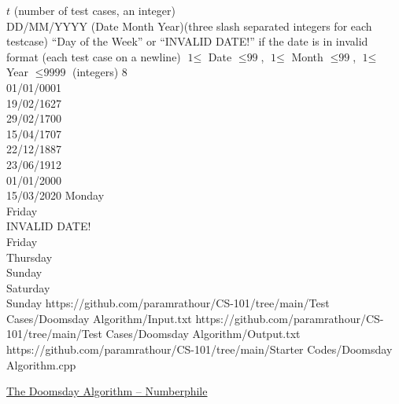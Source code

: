 \documentclass[../../Problems]{subfiles}
\begin{document}
\begin{testcasesMore}
	{$t$ \hfill(number of test cases, an integer)\\
	DD/MM/YYYY (Date Month Year)\hfill(three slash separated integers for each testcase)}
	{``Day of the Week'' or  ``INVALID DATE!'' if the date is in invalid format
 \hfill{(each test case on a newline)}}
	{$\text{1} \leq$ Date $\leq \text{99}$, $\text{1} \leq$ Month $\leq \text{99}$, $\text{1} \leq$ Year $\leq \text{9999}$ \hfill(integers)}
	{8\\01/01/0001\\19/02/1627\\29/02/1700\\15/04/1707\\22/12/1887\\23/06/1912\\01/01/2000\\15/03/2020}
	{Monday\\Friday\\INVALID DATE!\\Friday\\Thursday\\Sunday\\Saturday\\Sunday}
	{https://github.com/paramrathour/CS-101/tree/main/Test Cases/Doomsday Algorithm/Input.txt}
	{https://github.com/paramrathour/CS-101/tree/main/Test Cases/Doomsday Algorithm/Output.txt}
	{https://github.com/paramrathour/CS-101/tree/main/Starter Codes/Doomsday Algorithm.cpp}
\end{testcasesMore}
\begin{funvideo}{\label{sec:fvdoomsday}}
\href{https://youtu.be/z2x3SSBVGJU}{The Doomsday Algorithm -- Numberphile}
\end{funvideo}
\end{document}

